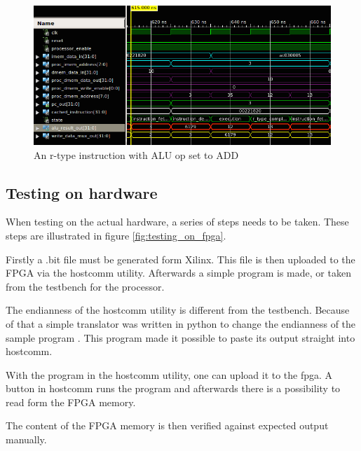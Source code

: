 \begin{figure}[ht!]
    \begin{center}
    \includegraphics[width=\textwidth]{assets/isim/r_type_cycle.png}
    \caption{An r-type instruction with ALU op set to ADD}
    \label{fig:r_type_cycle}
    \end{center}
\end{figure}

\clearpage

\subsection{Testing on hardware}

When testing on the actual hardware, a series of steps needs to be taken.
These steps are illustrated in figure \ref{fig:testing_on_fpga}.

Firstly a .bit file must be generated form Xilinx.
This file is then uploaded to the FPGA via the hostcomm utility.
Afterwards a simple program is made, or taken from the testbench for the processor.

The endianness of the hostcomm utility \cite{hostcomm} is different from the testbench.
Because of that a simple translator was written in python to change
the endianness of the sample program \cite{endian-change}.
This program made it possible to paste its output straight into hostcomm.

With the program in the hostcomm utility, one can upload it to the fpga.
A button in hostcomm runs the program and afterwards there is a possibility to read form the FPGA memory.

The content of the FPGA memory is then verified against expected output manually.

